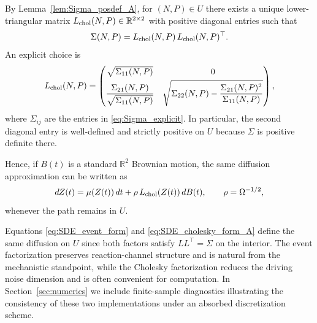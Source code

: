 \documentclass[pdflatex,sn-mathphys-ay]{sn-jnl}
\theoremstyle{thmstyleone}
\theoremstyle{definition}
\theoremstyle{remark}
\begin{document}
By Lemma~\ref{lem:Sigma_posdef_A}, for $(N,P)\in U$ there exists a unique lower-triangular matrix
$L_{\rm chol}(N,P)\in\mathbb{R}^{2\times 2}$ with positive diagonal entries such that
\begin{equation}\label{eq:Cholesky_identity_A}
\Sigma(N,P)=L_{\rm chol}(N,P)\,L_{\rm chol}(N,P)^\top .
\end{equation}
An explicit choice is
\begin{equation}\label{eq:Cholesky_explicit}
L_{\rm chol}(N,P)=
\begin{pmatrix}
\sqrt{\Sigma_{11}(N,P)} & 0\\[0.8ex]
\dfrac{\Sigma_{21}(N,P)}{\sqrt{\Sigma_{11}(N,P)}} &
\sqrt{\Sigma_{22}(N,P)-\dfrac{\Sigma_{21}(N,P)^2}{\Sigma_{11}(N,P)}}
\end{pmatrix},
\end{equation}
where $\Sigma_{ij}$ are the entries in \eqref{eq:Sigma_explicit}. In particular, the second diagonal entry is
well-defined and strictly positive on $U$ because $\Sigma$ is positive definite there.

Hence, if $B(t)$ is a standard $\mathbb{R}^2$ Brownian motion, the same diffusion approximation can be written as
\begin{equation}\label{eq:SDE_cholesky_form_A}
dZ(t)=\mu(Z(t))\,dt+\rho\,L_{\rm chol}(Z(t))\,dB(t),
\qquad \rho=\Omega^{-1/2},
\end{equation}
whenever the path remains in $U$.

Equations \eqref{eq:SDE_event_form} and \eqref{eq:SDE_cholesky_form_A} define the same diffusion on $U$ since both
factors satisfy $LL^\top=\Sigma$ on the interior. The event factorization preserves reaction-channel structure and is
natural from the mechanistic standpoint, while the Cholesky factorization reduces the driving noise dimension and is
often convenient for computation. In Section~\ref{sec:numerics} we include finite-sample diagnostics illustrating the
consistency of these two implementations under an absorbed discretization scheme.
\end{document}
